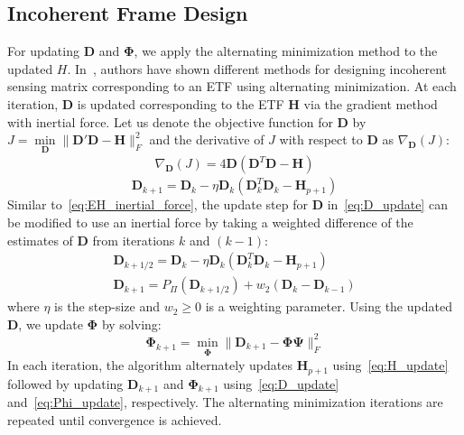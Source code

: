 \subsection{Incoherent Frame Design}
%
For updating $\bm{D}$ and $\bm{\Phi}$, we apply the alternating minimization method to the updated $H$.  In~\cite{Frame}, authors have shown different methods for designing incoherent sensing matrix corresponding to an ETF using alternating minimization. At each iteration, $\bm{D}$ is updated corresponding to the ETF $\bm{H}$ via the gradient method with inertial force. Let us denote the objective function for $\bm{D}$ %
by $J =  \underset{\bm{D}}{\min}\|\bm{D'D -H}\|_{F}^{2} $  and the derivative of $J$ with respect to $\bm{D}$ as $\nabla_{\bm{D}}(J)$:
%
\begin{align}\nonumber
    \nabla_{\bm{D}}(J) = 4\bm{D}\left(\bm{D}^{T}\bm{D} - \bm{H}\right)
\end{align}
%
\begin{equation}
    \label{eq:D_update}
     \bm{D}_{k + 1} = \bm{D}_{k} - \eta\bm{D}_{k}\left(\bm{D}_{k}^{T}\bm{D}_{k} - \bm{H}_{p+1}\right)
\end{equation}
%
Similar to~\eqref{eq:EH_inertial_force}, the update step for $\bm{D}$ in~\eqref{eq:D_update} can be modified to use an inertial force by taking a weighted difference of the estimates of $\bm{D}$ from iterations $k$ and $(k-1)$:
%
\begin{align}
    \bm{D}_{k + 1/2} = \bm{D}_{k} - \eta\bm{D}_{k}\left(\bm{D}_{k}^{T}\bm{D}_{k} - \bm{H}_{p+1}\right)\nonumber\\
    \bm{D}_{k + 1} = P_{\Pi}\left(\bm{D}_{k+ 1/2}\right) + w_{2}\left(\bm{D}_{k} - \bm{D}_{k-1}\right)
\end{align}
%
where $\eta$ is the step-size and $w_{2} \geq 0$ is a weighting parameter. Using the updated $\bm{D}$, we update $\bm{\Phi}$ by solving:
%
\begin{equation}
    \label{eq:Phi_update}
    \bm{\Phi}_{k + 1} = \underset{\bm{\Phi}}{\min} \|\bm{D}_{k+1} - \bm{\Phi \Psi}\|_{F}^{2}
\end{equation}
%
In each iteration, the algorithm alternately updates $\bm{H}_{p+1}$ using~\eqref{eq:H_update} followed by updating $\bm{D}_{k + 1}$ and $\bm{\Phi}_{k+1}$ using~\eqref{eq:D_update} and~\eqref{eq:Phi_update}, respectively. The alternating minimization iterations are repeated until convergence is achieved.
